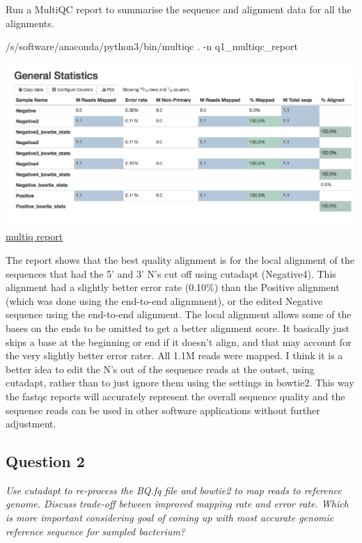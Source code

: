 \documentclass[12pt,]{article}
\newenvironment{Shaded}{\begin{snugshade}}{\end{snugshade}}
\newcommand{\ExtensionTok}[1]{#1}
\newcommand{\NormalTok}[1]{#1}
\begin{document}
Run a MultiQC report to summarise the sequence and alignment data for
all the alignments.

\begin{Shaded}
\begin{Highlighting}[]
\ExtensionTok{/s/software/anaconda/python3/bin/multiqc}\NormalTok{ . -n q1_multiqc_report}
\end{Highlighting}
\end{Shaded}

\includegraphics{MultiQCstats_Q1.png}\\
\href{/d/projects/u/sj003/results_cw1/q1_multiqc_report.html}{multiq
report}

The report shows that the best quality alignment is for the local
alignment of the sequences that had the 5' and 3' N's cut off using
cutadapt (Negative4). This alignment had a slightly better error rate
(0.10\%) than the Positive alignment (which was done using the
end-to-end alignmnent), or the edited Negative sequence using the
end-to-end alignment. The local alignment allows some of the bases on
the ends to be omitted to get a better alignment score. It basically
just skips a base at the beginning or end if it doesn't align, and that
may account for the very slightly better error rater. All 1.1M reads
were mapped. I think it is a better idea to edit the N's out of the
sequence reads at the outset, using cutadapt, rather than to just ignore
them using the settings in bowtie2. This way the fastqc reports will
accurately represent the overall sequence quality and the sequence reads
can be used in other software applications without further adjustment.

\subsection{Question 2}\label{question-2}

\emph{Use cutadapt to re-process the BQ.fq file and bowtie2 to map reads
to reference genome. Discuss trade-off between improved mapping rate and
error rate. Which is more important considering goal of coming up with
most accurate genomic reference sequence for sampled bacterium?}
\end{document}
